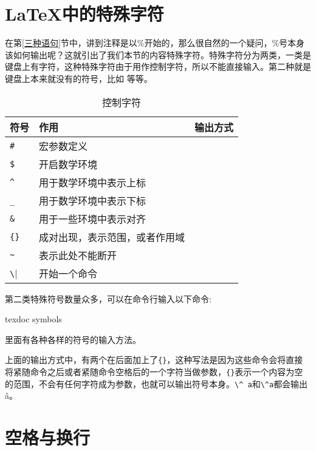 \section{\LaTeX 中的特殊字符}
在第\ref{三种语句}节中，讲到注释是以\%开始的，那么很自然的一个疑问，\%号本身该如何输出呢？这就引出了我们本节的内容特殊字符。特殊字符分为两类，一类是键盘上有字符，这种特殊字符由于用作控制字符，所以不能直接输入。第二种就是键盘上本来就没有的符号，比如\alpha\beta
等等。
\begin{table}[ht]
	\centering
	\begin{tabular}{lll} \toprule
		符号      & 作用                           & 输出方式                   \\ \midrule
		\verb|#|  & 宏参数定义                     & \texinline{\#}             \\
		\verb|$|  & 开启数学环境                   & \texinline{\$}             \\
		\verb|^|  & 用于数学环境中表示上标         & \texinline{\^{}}           \\
		\verb|_|  & 用于数学环境中表示下标         & \texinline{\_}             \\
		\verb|&|  & 用于一些环境中表示对齐         & \texinline{\&}             \\
		\verb|{}| & 成对出现，表示范围，或者作用域 & \texinline{\{ \}}          \\
		\verb|~|  & 表示此处不能断开               & \texinline{\~{}}           \\
		\verb|\|  & 开始一个命令                   & \texinline{\textbackslash} \\ \bottomrule
	\end{tabular}
	\caption{控制字符}
\end{table}

\pagebreak
第二类特殊符号数量众多，可以在命令行输入以下命令:
\begin{shellcmd}
	texdoc symbols
\end{shellcmd}

里面有各种各样的符号的输入方法。

上面的输出方式中，有两个在后面加上了\verb|{}|，这种写法是因为这些命令会将直接将紧随命令之后或者紧随命令空格后的一个字符当做参数，\verb|{}|表示一个内容为空的范围，不会有任何字符成为参数，也就可以输出符号本身。\verb|\^ a|和\verb|\^a|都会输出\^a。

\section{空格与换行}
